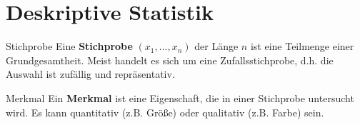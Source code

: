 \section{Deskriptive Statistik}

\begin{definition}{Stichprobe}
    Eine \textbf{Stichprobe} $(x_1,...,x_n)$ der Länge $n$ ist eine Teilmenge einer Grundgesamtheit. 
    Meist handelt es sich um eine Zufallsstichprobe, d.h. die Auswahl ist zufällig und repräsentativ.
\end{definition}

\begin{definition}{Merkmal}
    Ein \textbf{Merkmal} ist eine Eigenschaft, die in einer Stichprobe untersucht wird. 
    Es kann quantitativ (z.B. Größe) oder qualitativ (z.B. Farbe) sein.
    
\end{definition}